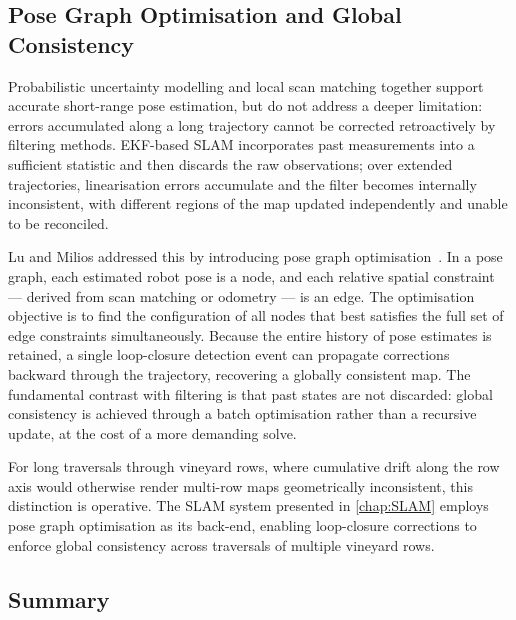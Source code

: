 \subsection{Pose Graph Optimisation and Global Consistency}
\label{subsec:pose-graph-optimisation}

Probabilistic uncertainty modelling and local scan matching together support accurate short-range pose estimation, but do not address a deeper limitation: errors accumulated along a long trajectory cannot be corrected retroactively by filtering methods. EKF-based SLAM incorporates past measurements into a sufficient statistic and then discards the raw observations; over extended trajectories, linearisation errors accumulate and the filter becomes internally inconsistent, with different regions of the map updated independently and unable to be reconciled.

Lu and Milios addressed this by introducing pose graph optimisation~\cite{luGloballyConsistentRange1997}. In a pose graph, each estimated robot pose is a node, and each relative spatial constraint --- derived from scan matching or odometry --- is an edge. The optimisation objective is to find the configuration of all nodes that best satisfies the full set of edge constraints simultaneously. Because the entire history of pose estimates is retained, a single loop-closure detection event can propagate corrections backward through the trajectory, recovering a globally consistent map. The fundamental contrast with filtering is that past states are not discarded: global consistency is achieved through a batch optimisation rather than a recursive update, at the cost of a more demanding solve.

For long traversals through vineyard rows, where cumulative drift along the row axis would otherwise render multi-row maps geometrically inconsistent, this distinction is operative. The SLAM system presented in \cref{chap:SLAM} employs pose graph optimisation as its back-end, enabling loop-closure corrections to enforce global consistency across traversals of multiple vineyard rows.

\subsection{Summary}
\label{subsec:robot-localisation-summary}

